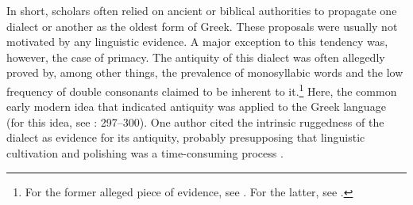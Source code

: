 In short, scholars often relied on ancient or biblical authorities to propagate one dialect or another as the oldest form of Greek. These proposals were usually not motivated by any linguistic evidence. A major exception to this tendency was, however, the case of  primacy. The antiquity of this dialect was often allegedly proved by, among other things, the prevalence of monosyllabic words and the low frequency of double consonants claimed to be inherent to it.\footnote{For the former alleged piece of evidence, see \citet[17]{Munthe1748}. For the latter, see \citet[\textsc{xxvi}]{Harles1778}.} Here, the common early modern idea that  indicated antiquity was applied to the Greek language (for this idea, see \citealt{Jansen1995}: 297–300). One  author cited the intrinsic ruggedness of the  dialect as evidence for its antiquity, probably presupposing that linguistic cultivation and polishing was a time-consuming process \citep[21]{Gedike1782}.

